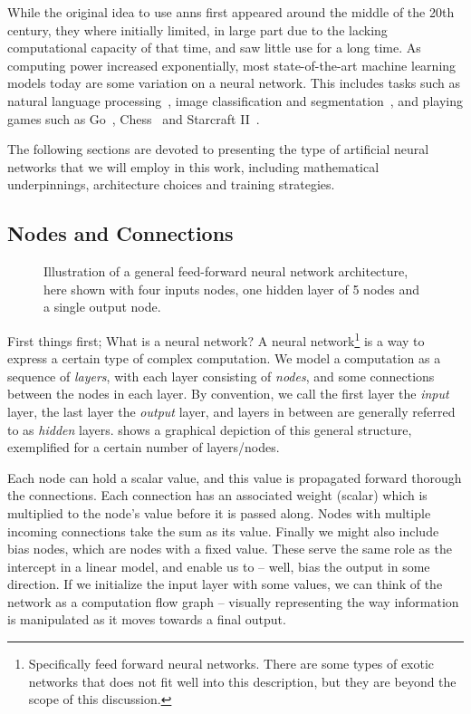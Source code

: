 \documentclass[Thesis.tex]{subfiles}
\begin{document}
While the original idea to use \glspl{ann} first appeared around the middle of the 20th
century, they where initially limited, in large part due to the lacking
computational capacity of that time, and saw little use for a long time. As
computing power increased exponentially, most state-of-the-art
machine learning models today are some variation on a neural network. This
includes tasks such as natural language processing~\cite{bert-2018}, image classification and
segmentation~\cite{gpipe-2018}, and playing games such as Go~\cite{deepmind-alpha-go-zero},
Chess~\cite{deepmind-alpha-zero} and Starcraft II~\cite{vinyals_babuschkin_chung_mathieu_2019}.

The following sections are devoted to presenting the type of artificial neural
networks that we will employ in this work, including mathematical underpinnings,
architecture choices and training strategies.

\subsection{Nodes and Connections}

\begin{figure}[h]
  \centering
  
  \caption[Illustration of an artificial neural network]{Illustration of a general feed-forward neural network architecture,
    here shown with four inputs nodes, one hidden layer of 5 nodes and a
    single output node.}
  \label{fig:neural-network-example-diagram}
\end{figure}

First things first; What is a neural network? A neural
network\footnote{Specifically feed forward neural networks. There are some types
of exotic networks that does not fit well into this description, but they are
beyond the scope of this discussion.} is a way to express a certain type of
complex computation. We model a computation as a sequence of \emph{layers}, with
each layer consisting of \emph{nodes}, and some connections between the nodes in
each layer. By convention, we call the first layer the \emph{input} layer, the
last layer the \emph{output} layer, and layers in between are
generally referred to as \emph{hidden} layers.
 shows a graphical depiction of this
general structure, exemplified for a certain number of layers/nodes.

Each node can hold a scalar value, and this value is propagated forward thorough
the connections. Each connection has an associated weight (scalar) which is
multiplied to the node's value before it is passed along. Nodes with multiple
incoming connections take the sum as its value. Finally we might also include
bias nodes, which are nodes with a fixed value. These serve the same role as the
intercept in a linear model, and enable us to -- well, bias the output in some
direction. If we initialize the input layer with some values, we can think of
the network as a computation flow graph -- visually representing the way
information is manipulated as it moves towards a final output.
\end{document}
